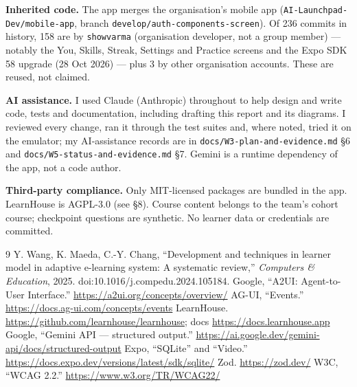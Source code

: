 \documentclass[11pt,a4paper]{article}
\newcommand{\fp}[1]{\nolinkurl{#1}}
\begin{document}
\textbf{Inherited code.} The app merges the organisation's mobile app (\texttt{AI-Launchpad-Dev/mobile-app},
branch \texttt{develop/auth-components-screen}). Of 236 commits in history, 158 are by
\texttt{showvarma} (organisation developer, not a group member) — notably the You, Skills, Streak,
Settings and Practice screens and the Expo SDK 58 upgrade (28 Oct 2026) — plus 3 by other
organisation accounts. These are reused, not claimed.

\textbf{AI assistance.} I used Claude (Anthropic) throughout to help design and write code, tests
and documentation, including drafting this report and its diagrams. I reviewed every change, ran it
through the test suites and, where noted, tried it on the emulator; my AI-assistance records are in
\fp{docs/W3-plan-and-evidence.md} §6 and \fp{docs/W5-status-and-evidence.md} §7. Gemini is a runtime
dependency of the app, not a code author.

\textbf{Third-party compliance.} Only MIT-licensed packages are bundled in the app. LearnHouse is
AGPL-3.0 (see §8). Course content belongs to the team's cohort course; checkpoint questions are
synthetic. No learner data or credentials are committed.

\begin{thebibliography}{9}\small
{} Y. Wang, K. Maeda, C.-Y. Chang, ``Development and techniques in learner model in adaptive e-learning system: A systematic review,'' \emph{Computers \& Education}, 2025. doi:10.1016/j.compedu.2024.105184.
 Google, ``A2UI: Agent-to-User Interface.'' \url{https://a2ui.org/concepts/overview/}
 AG-UI, ``Events.'' \url{https://docs.ag-ui.com/concepts/events}
 LearnHouse. \url{https://github.com/learnhouse/learnhouse}; docs \url{https://docs.learnhouse.app}
 Google, ``Gemini API — structured output.'' \url{https://ai.google.dev/gemini-api/docs/structured-output}
 Expo, ``SQLite'' and ``Video.'' \url{https://docs.expo.dev/versions/latest/sdk/sqlite/}
 Zod. \url{https://zod.dev/}
 W3C, ``WCAG 2.2.'' \url{https://www.w3.org/TR/WCAG22/}
\end{thebibliography}

\appendix
\end{document}
